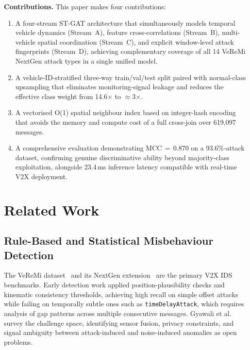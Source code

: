 \documentclass[conference]{IEEEtran}
\begin{document}
\textbf{Contributions.}  This paper makes four contributions:
\begin{enumerate}
\item A four-stream ST-GAT architecture that simultaneously models temporal
  vehicle dynamics (Stream~A), feature cross-correlations (Stream~B),
  multi-vehicle spatial coordination (Stream~C), and explicit window-level
  attack fingerprints (Stream~D), achieving complementary coverage of all
  14 VeReMi NextGen attack types in a single unified model.
\item A vehicle-ID-stratified three-way train/val/test split paired with
  normal-class upsampling that eliminates monitoring-signal leakage and
  reduces the effective class weight from 14.6$\times$ to $\approx$3$\times$.
\item A vectorised O(1) spatial neighbour index based on integer-hash
  encoding that avoids the memory and compute cost of a full cross-join
  over 619,097 messages.
\item A comprehensive evaluation demonstrating MCC\,$=$\,0.870 on a
  93.6\%-attack dataset, confirming genuine discriminative ability beyond
  majority-class exploitation, alongside 23.4\,ms inference latency
  compatible with real-time V2X deployment.
\end{enumerate}

\section{Related Work}
\label{sec:related}

\subsection{Rule-Based and Statistical Misbehaviour Detection}

The VeReMi dataset~\cite{vanderheijden2018veremi} and its NextGen
extension~\cite{kamel2020veremi} are the primary V2X IDS benchmarks.
Early detection work applied position-plausibility checks and kinematic
consistency thresholds, achieving high recall on simple offset attacks
while failing on temporally subtle ones such as \texttt{timeDelayAttack},
which requires analysis of gap patterns across multiple consecutive
messages.  Gyawali et al.~\cite{gyawali2020challenges} survey the
challenge space, identifying sensor fusion, privacy constraints, and
signal ambiguity between attack-induced and noise-induced anomalies as
open problems.
\end{document}
